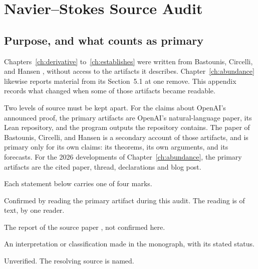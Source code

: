 \chapter{Navier--Stokes Source Audit}
\label{app:nsaudit}

\begin{center}
\end{center}

\section{Purpose, and what counts as primary}

Chapters~\ref{ch:derivative} to~\ref{ch:establishes} were written from Bastounis, Circelli, and Hansen \cite{BCH26}, without access to the artifacts it describes. Chapter~\ref{ch:abundance} likewise reports material from its Section~5.1 at one remove. This appendix records what changed when some of those artifacts became readable.

Two levels of source must be kept apart. For the claims about OpenAI's announced proof, the primary artifacts are OpenAI's natural-language paper, its Lean repository, and the program outputs the repository contains. The paper of Bastounis, Circelli, and Hansen is a secondary account of those artifacts, and is primary only for its own claims: its theorems, its own arguments, and its forecasts. For the 2026 developments of Chapter~\ref{ch:abundance}, the primary artifacts are the cited paper, thread, declarations and blog post.

Each statement below carries one of four marks.

\begin{description}[leftmargin=1.4cm,labelwidth=1.2cm,font=\normalfont\bfseries]
\item[P] Confirmed by reading the primary artifact during this audit. The reading is of text, by one reader.
\item[S] The report of the source paper \cite{BCH26}, not confirmed here.
\item[I] An interpretation or classification made in the monograph, with its stated status.
\item[U] Unverified. The resolving source is named.
\end{description}

